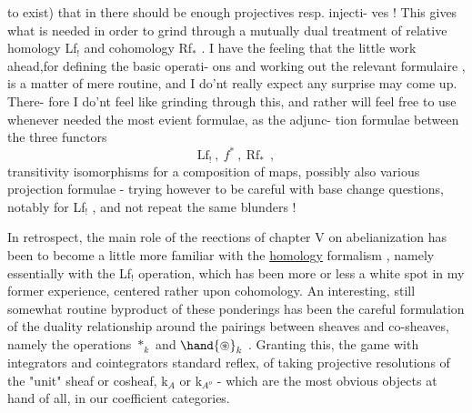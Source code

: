 
to exist)  that in  there should be enough projectives resp. injecti-%
ves !  This gives what is needed  in order to grind through a mutually
dual treatment of relative homology Lf$_{!}$  and cohomology Rf$_{*}$ .  I have
the feeling that the little work ahead,for defining the basic operati-%
ons and working out the relevant formulaire , is a matter of mere
routine,  and I do'nt really expect any surprise may come up.  There-%
fore I do'nt feel like grinding through this,  and rather will feel
free to use whenever needed the most evient formulae,  as the adjunc-%
tion formulae between the three functors
\[ \mathrm{Lf}_{!}\ ,\ f^{*}\ ,\ \mathrm{Rf}_{*}\ \ , \]
transitivity isomorphisms for a composition of maps,  possibly also
various projection formulae  -  trying however to be careful with
base change questions,  notably for Lf$_{!}$ ,  and not repeat the same
blunders !

In retrospect,  the main role  of the reections of chapter V
on abelianization has been to become a little more familiar with the
\uline{homology} formalism , namely essentially with the Lf$_{!}$ operation, which
has been more or less a white spot in my former experience,  centered
rather upon cohomology.   An interesting,  still somewhat routine
byproduct of these ponderings has been the careful formulation of the
duality relationship  around the pairings between sheaves and
co-sheaves, namely the operations $*_{k}$ and $\hand{\circledast}_{k}$ .  Granting this,  the
game with integrators and cointegrators   standard
reflex,  of taking projective resolutions of the "unit" sheaf or
cosheaf,  k$_{A}$ or k$_{A^{o}}$  - which are the most obvious objects at hand of
all,   in our coefficient categories.

